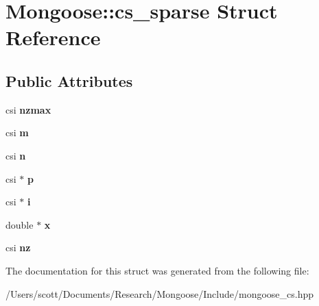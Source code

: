 \hypertarget{struct_mongoose_1_1cs__sparse}{}\section{Mongoose\+:\+:cs\+\_\+sparse Struct Reference}
\label{struct_mongoose_1_1cs__sparse}
\subsection*{Public Attributes}
\begin{DoxyCompactItemize}
\item 
csi {\bfseries nzmax}\hypertarget{struct_mongoose_1_1cs__sparse_a4b62d44f6e046a11e24fb4028bf43a58}{}\label{struct_mongoose_1_1cs__sparse_a4b62d44f6e046a11e24fb4028bf43a58}

\item 
csi {\bfseries m}\hypertarget{struct_mongoose_1_1cs__sparse_ad08c828ac4d26770ff476157109a6ab2}{}\label{struct_mongoose_1_1cs__sparse_ad08c828ac4d26770ff476157109a6ab2}

\item 
csi {\bfseries n}\hypertarget{struct_mongoose_1_1cs__sparse_a477b87510bd9ab4fd0be42b280298bcd}{}\label{struct_mongoose_1_1cs__sparse_a477b87510bd9ab4fd0be42b280298bcd}

\item 
csi $\ast$ {\bfseries p}\hypertarget{struct_mongoose_1_1cs__sparse_adcc930ca8f0aa79060ae413f76e8d946}{}\label{struct_mongoose_1_1cs__sparse_adcc930ca8f0aa79060ae413f76e8d946}

\item 
csi $\ast$ {\bfseries i}\hypertarget{struct_mongoose_1_1cs__sparse_a9733803e561ead0b40cfb544f3fc288e}{}\label{struct_mongoose_1_1cs__sparse_a9733803e561ead0b40cfb544f3fc288e}

\item 
double $\ast$ {\bfseries x}\hypertarget{struct_mongoose_1_1cs__sparse_aea951a87409147febd5e2fcf5b798e36}{}\label{struct_mongoose_1_1cs__sparse_aea951a87409147febd5e2fcf5b798e36}

\item 
csi {\bfseries nz}\hypertarget{struct_mongoose_1_1cs__sparse_a38b622c3f519f870e72c119fbf8cbc17}{}\label{struct_mongoose_1_1cs__sparse_a38b622c3f519f870e72c119fbf8cbc17}

\end{DoxyCompactItemize}


The documentation for this struct was generated from the following file\+:\begin{DoxyCompactItemize}
\item 
/\+Users/scott/\+Documents/\+Research/\+Mongoose/\+Include/mongoose\+\_\+cs.\+hpp\end{DoxyCompactItemize}
